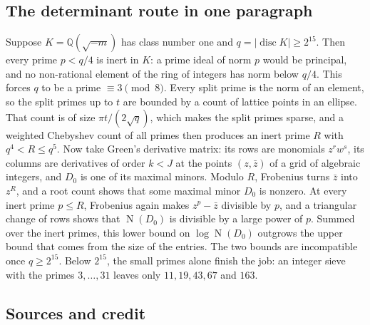 \documentclass[11pt]{article}
\theoremstyle{definition}
\newcommand{\Q}{\mathbb{Q}}
\newcommand{\disc}{\operatorname{disc}}
\newcommand{\Nm}{\operatorname{N}}
\begin{document}
\subsection{The determinant route in one paragraph}

Suppose $K = \Q(\sqrt{-m})$ has class number one and $q = |\disc K| \ge 2^{15}$. Then every prime $p < q/4$ is inert in $K$: a prime ideal of norm $p$ would be principal, and no non-rational element of the ring of integers has norm below $q/4$. This forces $q$ to be a prime $\equiv 3 \pmod 8$. Every split prime is the norm of an element, so the split primes up to $t$ are bounded by a count of lattice points in an ellipse. That count is of size $\pi t/(2\sqrt q)$, which makes the split primes sparse, and a weighted Chebyshev count of all primes then produces an inert prime $R$ with $q^4 < R \le q^5$. Now take Green's derivative matrix: its rows are monomials $z^r w^s$, its columns are derivatives of order $k < J$ at the points $(z, \bar z)$ of a grid of algebraic integers, and $D_0$ is one of its maximal minors. Modulo $R$, Frobenius turns $\bar z$ into $z^R$, and a root count shows that some maximal minor $D_0$ is nonzero. At every inert prime $p \le R$, Frobenius again makes $z^p - \bar z$ divisible by $p$, and a triangular change of rows shows that $\Nm(D_0)$ is divisible by a large power of $p$. Summed over the inert primes, this lower bound on $\log \Nm(D_0)$ outgrows the upper bound that comes from the size of the entries. The two bounds are incompatible once $q \ge 2^{15}$. Below $2^{15}$, the small primes alone finish the job: an integer sieve with the primes $3, \ldots, 31$ leaves only $11, 19, 43, 67$ and $163$.

\subsection{Sources and credit}\label{sec:credit}
\end{document}
